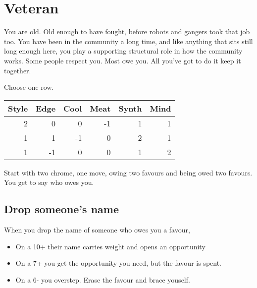 \documentclass{tufte-book}
\begin{document}


\section{Veteran} \label{sec:Veteran}

You are old. Old enough to have fought, before robots and gangers took that job too. You have been in the community a long time, and like anything that sits still long enough here, you play a supporting structural role in how the community works. Some people respect you. Most owe you. All you've got to do it keep it together.


Choose one row.
\begin{table}[ht]
\centering
{}\selectfont
\begin{tabular}{rrrrrr}
\toprule
Style & Edge & Cool & Meat & Synth & Mind\\
\midrule
2&0&0&-1&1&1\\
1&1&-1&0&2&1\\
1&-1&0&0&1&2\\
\bottomrule
\end{tabular}
\end{table}

Start with two chrome, one move, owing two favours and being owed two favours. You get to say who owes you.

\subsection{Drop someone's name}
When you drop the name of someone who owes you a favour, 
\begin{itemize}
	\item On a 10+ their name carries weight and opens an opportunity
	\item On a 7+ you get the opportunity you need, but the favour is spent.
	\item On a 6- you overstep. Erase the favour and brace youself.
\end{itemize}
\end{document}
